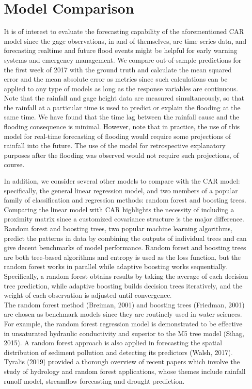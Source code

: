 \documentclass{svjour3}
\renewcommand\hl[1]{#1}
\begin{document}
\section{Model Comparison}\label{sec:model_comp}
It is of interest to evaluate the forecasting capability of the aforementioned CAR model since the gage observations, in and of themselves, are time series data, and forecasting realtime and future flood events might be helpful for early warning systems and emergency management.
We compare out-of-sample predictions for the first week of 2017 with the ground truth and calculate the mean squared error and the mean absolute error as metrics since such calculations can be applied to any type of models as long as the response variables are continuous.
\hl{Note that the rainfall and gage height data are measured simultaneously, so that the rainfall at a particular time is used to predict or explain the flooding at the same time. We have found that the time lag between the rainfall cause and the flooding consequence is minimal.  However, note that in practice, the use of this model for real-time forecasting of flooding would require some projections of rainfall into the future. The use of the model for retrospective explanatory purposes after the flooding was observed would not require such projections, of course.}

In addition, we consider several other models to compare with the CAR model: specifically, the general linear regression model, and two members of a popular family of classification and regression methods:  random forest and boosting trees.
 Comparing the linear model with CAR highlights the necessity of including a proximity matrix since a customized covariance structure is the major difference.
 Random forest and boosting trees, two popular machine learning algorithms, predict the patterns in data by combining the outputs of individual trees and can give decent benchmarks of model performance.
 Random forest and boosting trees are both tree-based algorithms and entropy is used as the loss function, but the random forest works in parallel while adaptive boosting works sequentially.
 Specifically, a random forest obtains results by taking the average of each decision tree prediction, while adaptive boosting builds decision trees iteratively, and the weight of each observation is adjusted until convergence. \\

\hl{The random forest method (Breiman, 2001) and boosting trees (Friedman, 2001) are chosen as benchmark models since they are routinely used in water sciences.
For example, the random forest regression model is demonstrated to be effective in unsaturated hydraulic conductivity and superior to the M5 tree model (Sihag, 2015).
A random forest approach is also applied in forecasting the spatial distribution of sediment pollution and detecting its predictors (Walsh, 2017).
Tyralis (2019) provided a thorough overview of recent papers which involve the study of hydrology and random forest applications, whose themes include rainfall runoff model, streamflow forecasting and  drought prediction.}\\
\end{document}
